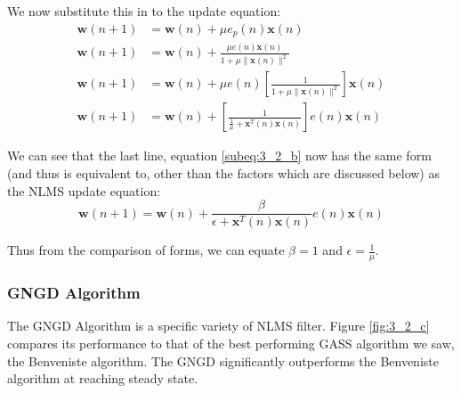 \documentclass[./main.tex]{subfiles}
\begin{document}
We now substitute this in to the update equation:
\begin{subequations}
	\begin{align}
	\mathbf{w}(n+1) &= \mathbf{w}(n) + \mu e_p(n) \mathbf{x}(n) \\
	\mathbf{w}(n+1) &= \mathbf{w}(n) + \frac{\mu e(n) \mathbf{x}(n)}{1 + \mu \lVert \mathbf{x}(n) \rVert^2 } \\
	\mathbf{w}(n+1) &= \mathbf{w}(n) + \mu e(n) \left[ \frac{ 1 }{1 + \mu \lVert \mathbf{x}(n) \rVert^2} \right] \mathbf{x}(n) \\
	\mathbf{w}(n+1) &= \mathbf{w}(n) + \left[ \frac{1}{\frac{1}{\mu} + \mathbf{x}^T(n)\mathbf{x}(n) } \right] e(n) \mathbf{x}(n)  \label{subeq:3_2_b}	\end{align}
\end{subequations}

We can see that the last line, equation \ref{subeq:3_2_b} now has the same form (and thus is equivalent to, other than the factors which are discussed below) as the NLMS update equation:
$$ \mathbf{w}(n+1) = \mathbf{w}(n) + \frac{\beta}{\epsilon + \mathbf{x}^T(n)\mathbf{x}(n)} e(n) \mathbf{x}(n) $$

Thus from the comparison of forms, we can equate $ \beta = 1 $ and $ \epsilon = \frac{1}{\mu} $.

\subsubsection{GNGD Algorithm}

The GNGD Algorithm is a specific variety of NLMS filter. Figure \ref{fig:3_2_c} compares its performance to that of the best performing GASS algorithm we saw, the Benveniste algorithm. The GNGD significantly outperforms the Benveniste algorithm at reaching steady state.
\end{document}
